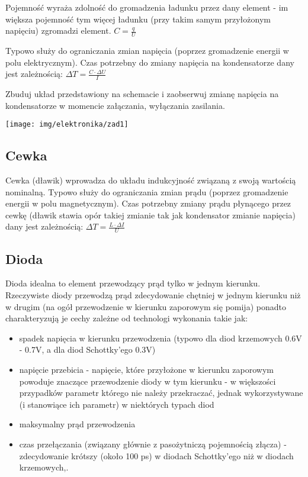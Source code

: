 \documentclass{pdfBooklets}
\begin{document}
Pojemność wyraża zdolność do gromadzenia ładunku przez dany element - im większa pojemność tym więcej ładunku (przy takim samym przyłożonym napięciu) zgromadzi element. $C = \frac{q}{U}$

Typowo służy do ograniczania zmian napięcia (poprzez gromadzenie energii w polu elektrycznym). Czas potrzebny do zmiany napięcia na kondensatorze dany jest zależnością: $\Delta T = \frac{C \cdot \Delta U}{I}$

\begin{Zadanie}{}{}
\noindent\begin{minipage}[b]{0.55\textwidth}
Zbuduj układ przedstawiony na schemacie i zaobserwuj zmianę napięcia na kondensatorze w momencie załączania, wyłączania zasilania.
\vspace{1cm}
\end{minipage}
\hfill
\begin{minipage}[b]{0.4\textwidth}
\texttt{[image: img/elektronika/zad1]}
\end{minipage}
\end{Zadanie}

\subsection{Cewka}
Cewka (dławik) wprowadza do układu indukcyjność związaną z swoją wartością nominalną. Typowo służy do ograniczania zmian prądu (poprzez gromadzenie energii w polu magnetycznym). Czas potrzebny zmiany prądu płynącego przez cewkę (dławik stawia opór takiej zmianie tak jak kondensator zmianie napięcia) dany jest zależnością: $\Delta T = \frac{L \cdot \Delta I}{U}$


\subsection{Dioda}
Dioda idealna to element przewodzący prąd tylko w jednym kierunku. Rzeczywiste diody przewodzą prąd zdecydowanie chętniej w jednym kierunku niż w drugim (na ogół przewodzenie w kierunku zaporowym się pomija) ponadto charakteryzują je cechy zależne od technologi wykonania takie jak:
\begin{itemize}
\item spadek napięcia w kierunku przewodzenia (typowo dla diod krzemowych 0.6V - 0.7V, a dla diod Schottky’ego 0.3V)
\item napięcie przebicia - napięcie, które przyłożone w kierunku zaporowym powoduje znaczące przewodzenie diody w tym kierunku - w większości przypadków parametr którego nie należy przekraczać, jednak wykorzystywane (i stanowiące ich parametr) w niektórych typach diod
\item maksymalny prąd przewodzenia
\item czas przełączania (związany głównie z pasożytniczą pojemnością złącza) - zdecydowanie krótszy (około 100 ps) w diodach Schottky’ego niż w diodach krzemowych,.
\end{itemize}
\end{document}
